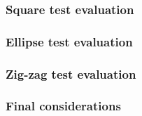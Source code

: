 \subsubsection{Square test evaluation}
\label{subsubsec:squaretest}

\subsubsection{Ellipse test evaluation}
\label{subsubsec:ellipsetest}

\subsubsection{Zig-zag test evaluation}
\label{subsubsec:zigzagtest}

\subsubsection{Final considerations}
\label{subsubsec:finalconsiderations}
